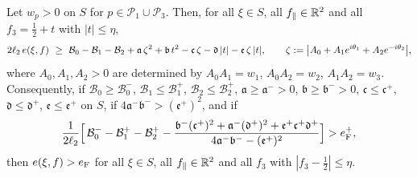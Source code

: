 \begin{lemma}\label{lem:det-fibre}
Let $w_p>0$ on $S$ for $p\in\mathcal P_1\cup\mathcal P_3$. Then, for all $\xi\in S$, all $f_\parallel\in\mathbb R^2$ and all $f_3=\frac12+t$ with
$|t|\le\eta$,
\begin{equation}\label{eq:det-fibre}
  2\ell_2\,e(\xi,f)\ \ge\ \mathcal B_0-\mathcal B_1-\mathcal B_2+\mathfrak a\,\zeta^2+\mathfrak b\,t^2-\mathfrak c\,\zeta-\mathfrak d\,|t|-\mathfrak e\,\zeta\,|t| ,
  \qquad\zeta:=\bigl|A_0+A_1e^{i\theta_1}+A_2e^{-i\theta_2}\bigr|,
\end{equation}
where $A_0,A_1,A_2>0$ are determined by $A_0A_1=w_1$, $A_0A_2=w_2$, $A_1A_2=w_3$. Consequently, if
$\mathcal B_0\ge\mathcal B_0^-$, $\mathcal B_1\le\mathcal B_1^+$, $\mathcal B_2\le\mathcal B_2^+$,
$\mathfrak a\ge\mathfrak a^->0$, $\mathfrak b\ge\mathfrak b^->0$, $\mathfrak c\le\mathfrak c^+$, $\mathfrak d\le\mathfrak d^+$,
$\mathfrak e\le\mathfrak e^+$ on $S$, if $4\mathfrak a^-\mathfrak b^->(\mathfrak e^+)^2$, and if
\begin{equation}\label{eq:det-fibretest}
  \frac1{2\ell_2}\Bigl[\,\mathcal B_0^--\mathcal B_1^+-\mathcal B_2^+
    -\frac{\mathfrak b^-(\mathfrak c^+)^2+\mathfrak a^-(\mathfrak d^+)^2+\mathfrak e^+\mathfrak c^+\mathfrak d^+}{4\mathfrak a^-\mathfrak b^--(\mathfrak e^+)^2}\Bigr]>e_{\mathrm F}^+ ,
\end{equation}
then $e(\xi,f)>e_{\mathrm F}$ for all $\xi\in S$, all $f_\parallel\in\mathbb R^2$ and all $f_3$ with $|f_3-\frac12|\le\eta$.
\end{lemma}

